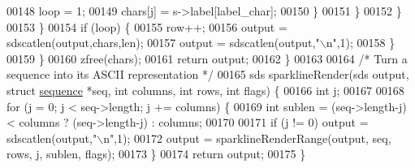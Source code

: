 \begin{DoxyCode}
00148                         loop = 1;
00149                         chars[j] = s->label[label\_char];
00150                     \}
00151                 \}
00152             \}
00153         \}
00154         \textcolor{keywordflow}{if} (loop) \{
00155             row++;
00156             output = sdscatlen(output,chars,len);
00157             output = sdscatlen(output,\textcolor{stringliteral}{"\(\backslash\)n"},1);
00158         \}
00159     \}
00160     zfree(chars);
00161     \textcolor{keywordflow}{return} output;
00162 \}
00163 
00164 \textcolor{comment}{/* Turn a sequence into its ASCII representation */}
00165 sds sparklineRender(sds output, \textcolor{keyword}{struct} \hyperlink{structsequence}{sequence} *seq, \textcolor{keywordtype}{int} columns, \textcolor{keywordtype}{int} rows, \textcolor{keywordtype}{int} flags) \{
00166     \textcolor{keywordtype}{int} j;
00167 
00168     \textcolor{keywordflow}{for} (j = 0; j < seq->length; j += columns) \{
00169         \textcolor{keywordtype}{int} sublen = (seq->length-j) < columns ? (seq->length-j) : columns;
00170 
00171         \textcolor{keywordflow}{if} (j != 0) output = sdscatlen(output,\textcolor{stringliteral}{"\(\backslash\)n"},1);
00172         output = sparklineRenderRange(output, seq, rows, j, sublen, flags);
00173     \}
00174     \textcolor{keywordflow}{return} output;
00175 \}
\end{DoxyCode}

